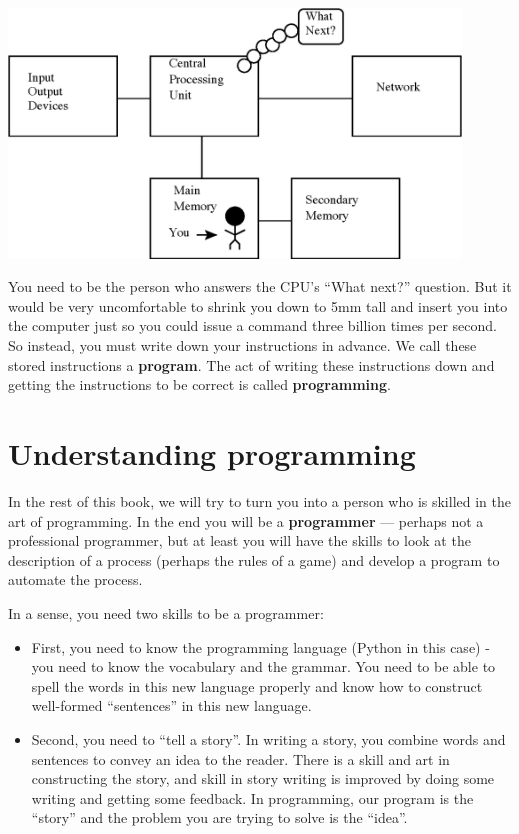 \beforefig
\centerline{\includegraphics[width=0.9\textwidth]{figs2/arch2NoSoftware.eps}}
\afterfig

You need to be the person who answers the CPU's ``What next?'' 
question.  But it would be very uncomfortable to shrink you 
down to 5mm tall and insert you into the computer just so you 
could issue a command three billion times per second.  So instead,
you must write down your instructions in advance.
We call these stored instructions a {\bf program}. The act 
of writing these instructions down and getting the instructions to 
be correct is called {\bf programming}.

\section{Understanding programming}

In the rest of this book, we will try to turn you into a person
who is skilled in the art of programming.  In the end you will be a 
{\bf programmer} --- perhaps not a professional programmer, but 
at least you will have the skills to look at the description
of a process (perhaps the rules of a game) and develop a program to automate the process.


In a sense, you need two skills to be a programmer:

\begin{itemize}

\item First, you need to know the programming language (Python in this case) -
you need to know the vocabulary and the grammar.  You need to be able 
to spell the words in this new language properly and know how to construct 
well-formed ``sentences'' in this new language.

\item Second, you need to ``tell a story''.  In writing a story,
you combine words and sentences to convey an idea to the reader. 
There is a skill and art in constructing the story, and skill in
story writing is improved by doing some writing and getting some
feedback.  In programming, our program is the ``story'' and the 
problem you are trying to solve is the ``idea''.

\end{itemize}

